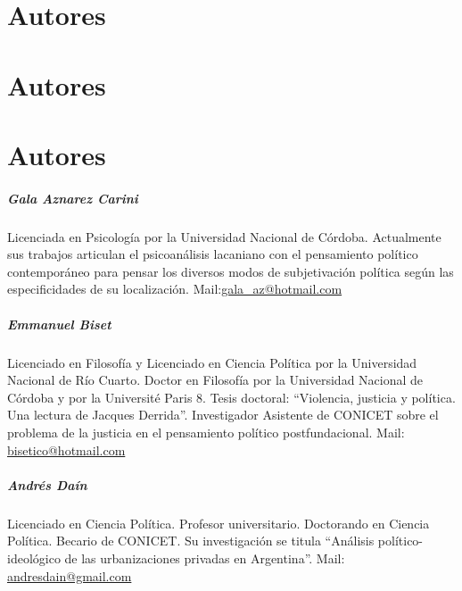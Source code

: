 \ifPDF
\chapter[\hspace{1.5pc}Autores]{Autores}
\setcounter{PrimPag}{\theCurrentPage}
\fi

\ifBNPDF
\chapter[\hspace{1.5pc}Autores]{Autores}
\fi

\ifHTMLEPUB
\chapter{Autores}
\fi

\paragraph{Gala Aznarez Carini} Licenciada en Psicología por la Universidad Nacional de Córdoba.
Actualmente sus trabajos articulan el psicoanálisis lacaniano con el
pensamiento político contemporáneo para pensar los diversos modos de
subjetivación política según las especificidades de su localización.
Mail:\url{gala\_az@hotmail.com}

\paragraph{Emmanuel Biset} Licenciado en Filosofía y Licenciado en Ciencia Política por la
Universidad Nacional de Río Cuarto. Doctor en Filosofía por la
Universidad Nacional de Córdoba y por la Université Paris 8. Tesis
doctoral: \enquote{Violencia, justicia y política. Una lectura de Jacques
	Derrida}. Investigador Asistente de CONICET sobre el problema de la
justicia en el pensamiento político postfundacional. Mail: \url{bisetico@hotmail.com}

\paragraph{Andrés Daín} Licenciado en Ciencia Política. Profesor universitario. Doctorando en
Ciencia Política. Becario de CONICET. Su investigación se titula
\enquote{Análisis político-ideológico de las urbanizaciones privadas en
	Argentina}. Mail: \url{andresdain@gmail.com}

